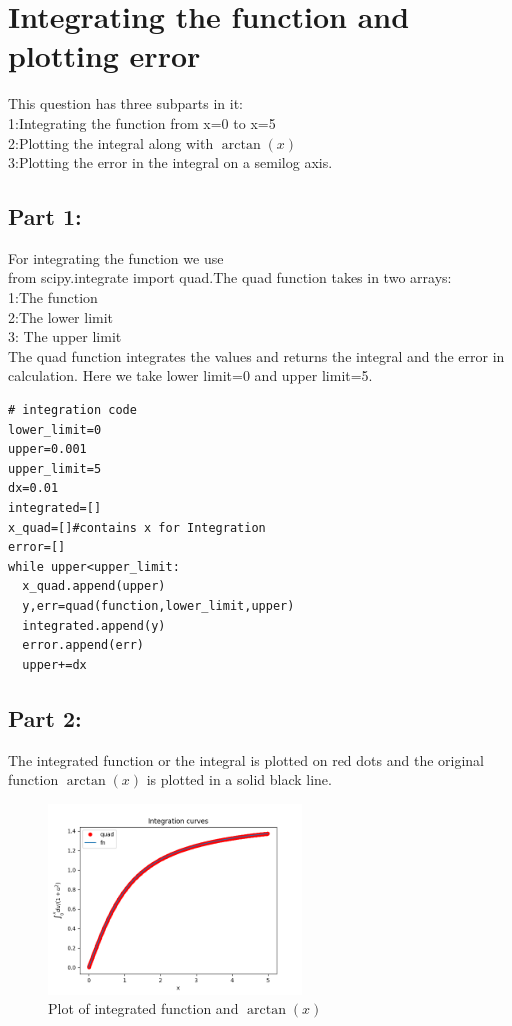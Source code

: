 \documentclass[11pt, a3paper]{article}
\begin{document}
\section{Integrating the function and plotting error}
This question has three subparts in it:\\
1:Integrating the function from x=0 to x=5\\
2:Plotting the integral along with $\arctan(x)$\\
3:Plotting the error in the integral on a semilog axis.\\


\subsection{Part 1:}
For integrating the function we use \\
{\selectfont
from scipy.integrate import quad}.The {\selectfont quad} function takes in two arrays:\\
1:The function\\
2:The lower limit\\
3: The upper limit\\
The quad function integrates the values and returns the integral and the error in calculation.
Here we take lower limit=0 and upper limit=5.
\begin{verbatim}
# integration code
lower_limit=0
upper=0.001
upper_limit=5
dx=0.01
integrated=[]
x_quad=[]#contains x for Integration
error=[]
while upper<upper_limit:
  x_quad.append(upper)
  y,err=quad(function,lower_limit,upper)
  integrated.append(y)
  error.append(err)
  upper+=dx
\end{verbatim}



\subsection{Part 2:}
The integrated function or the integral is plotted on red dots and the original function $\arctan(x)$ is plotted in a solid black line.
\begin{figure}[h!]
\includegraphics[width=0.6\textwidth, center]{Fig2.png}
 \caption{Plot of integrated function and $\arctan(x)$}
\end{figure}
\end{document}

